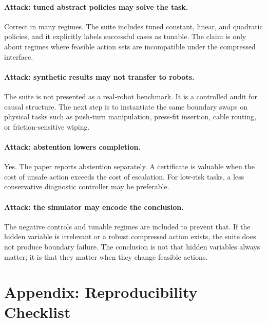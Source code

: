 \documentclass{article}
\begin{document}
\paragraph{Attack: tuned abstract policies may solve the task.}
Correct in many regimes. The suite includes tuned constant, linear, and quadratic
policies, and it explicitly labels successful cases as tunable. The claim is only
about regimes where feasible action sets are incompatible under the compressed
interface.

\paragraph{Attack: synthetic results may not transfer to robots.}
The suite is not presented as a real-robot benchmark. It is a controlled audit
for causal structure. The next step is to instantiate the same boundary swaps on
physical tasks such as push-turn manipulation, press-fit insertion, cable routing,
or friction-sensitive wiping.

\paragraph{Attack: abstention lowers completion.}
Yes. The paper reports abstention separately. A certificate is valuable when the
cost of unsafe action exceeds the cost of escalation. For low-risk tasks, a less
conservative diagnostic controller may be preferable.

\paragraph{Attack: the simulator may encode the conclusion.}
The negative controls and tunable regimes are included to prevent that. If the
hidden variable is irrelevant or a robust compressed action exists, the suite
does not produce boundary failure. The conclusion is not that hidden variables
always matter; it is that they matter when they change feasible actions.

\section{Appendix: Reproducibility Checklist}
\end{document}
